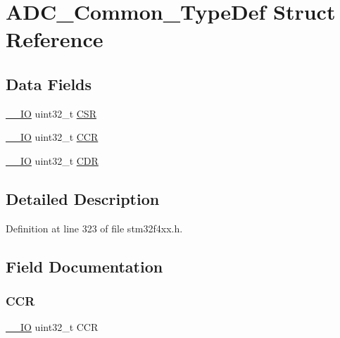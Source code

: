 \hypertarget{struct_a_d_c___common___type_def}{}\section{A\+D\+C\+\_\+\+Common\+\_\+\+Type\+Def Struct Reference}
\label{struct_a_d_c___common___type_def}
\subsection*{Data Fields}
\begin{DoxyCompactItemize}
\item 
\hyperlink{group___c_m_s_i_s__core__definitions_gaec43007d9998a0a0e01faede4133d6be}{\+\_\+\+\_\+\+IO} uint32\+\_\+t \hyperlink{struct_a_d_c___common___type_def_a876dd0a8546697065f406b7543e27af2}{C\+SR}
\item 
\hyperlink{group___c_m_s_i_s__core__definitions_gaec43007d9998a0a0e01faede4133d6be}{\+\_\+\+\_\+\+IO} uint32\+\_\+t \hyperlink{struct_a_d_c___common___type_def_a5e1322e27c40bf91d172f9673f205c97}{C\+CR}
\item 
\hyperlink{group___c_m_s_i_s__core__definitions_gaec43007d9998a0a0e01faede4133d6be}{\+\_\+\+\_\+\+IO} uint32\+\_\+t \hyperlink{struct_a_d_c___common___type_def_a760f86a1a18dffffda54fc15a977979f}{C\+DR}
\end{DoxyCompactItemize}


\subsection{Detailed Description}


Definition at line 323 of file stm32f4xx.\+h.



\subsection{Field Documentation}
\mbox{\label{struct_a_d_c___common___type_def_a5e1322e27c40bf91d172f9673f205c97}} 
\subsubsection{\texorpdfstring{C\+CR}{CCR}}
{\footnotesize\ttfamily \hyperlink{group___c_m_s_i_s__core__definitions_gaec43007d9998a0a0e01faede4133d6be}{\+\_\+\+\_\+\+IO} uint32\+\_\+t C\+CR}

